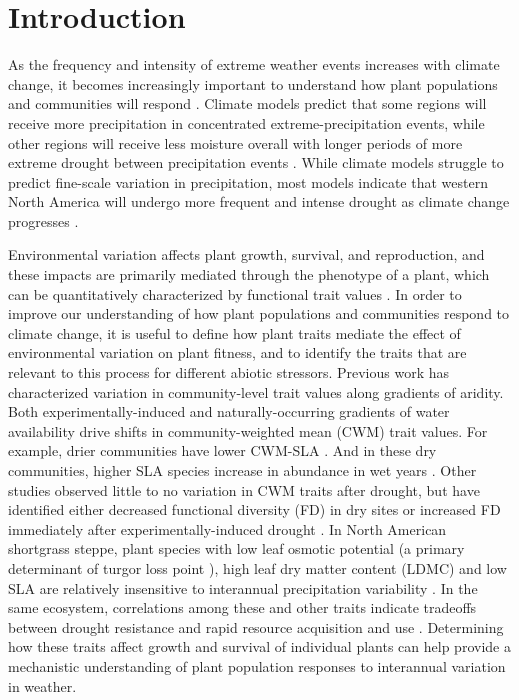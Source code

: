 \documentclass[12pt, letterpaper]{article}
\begin{document}
\section{Introduction}
As the frequency and intensity of extreme weather events increases with climate change, it becomes increasingly important to understand how plant populations and communities will respond . Climate models predict that some regions will receive more precipitation in concentrated extreme-precipitation events, while other regions will receive less moisture overall with longer periods of more extreme drought between precipitation events \cite{Knapp2008ConsequencesEcosystems}. While climate models struggle to predict fine-scale variation in precipitation, most models indicate that western North America will undergo more frequent and intense drought as climate change progresses \cite{Hartmann2013}.

Environmental variation affects plant growth, survival, and reproduction, and these impacts are primarily mediated through the phenotype of a plant, which can be quantitatively characterized by functional trait values . In order to improve our understanding of how plant populations and communities respond to climate change, it is useful to define how plant traits mediate the effect of environmental variation on plant fitness, and to identify the traits that are relevant to this process for different abiotic stressors. Previous work has characterized variation in community-level trait values along gradients of aridity. Both experimentally-induced and naturally-occurring gradients of water availability drive shifts in community-weighted mean (CWM) trait values. For example, drier communities have lower CWM-SLA \cite{Nunes2017WhichDrylands, Cornwell2009CommunityCalifornia}. And in these dry communities, higher SLA species increase in abundance in wet years \cite{Wilcox2020PlantPrairie}. Other studies observed little to no variation in CWM traits after drought, but have identified either decreased functional diversity (FD) in dry sites \cite{Luo2019LongGrasslands} or increased FD immediately after experimentally-induced drought \cite{Griffin-Nolan2019}. In North American shortgrass steppe, plant species with low leaf osmotic potential (a primary determinant of turgor loss point \cite{Bartlett2012a}), high leaf dry matter content (LDMC) and low SLA are relatively insensitive to interannual precipitation variability \cite{Wilcox2020PlantPrairie}. In the same ecosystem, correlations among these and other traits indicate tradeoffs between drought resistance and rapid resource acquisition and use \cite{Blumenthal2020}. Determining how these traits affect growth and survival of individual plants can help provide a mechanistic understanding of plant population responses to interannual variation in weather.
\end{document}

